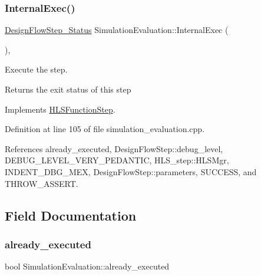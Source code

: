 \mbox{\label{classSimulationEvaluation_a08fa888750e787c0e4cdf88efcd50a8f}} 
\subsubsection{\texorpdfstring{Internal\+Exec()}{InternalExec()}}
{\footnotesize\ttfamily \hyperlink{design__flow__step_8hpp_afb1f0d73069c26076b8d31dbc8ebecdf}{Design\+Flow\+Step\+\_\+\+Status} Simulation\+Evaluation\+::\+Internal\+Exec (\begin{DoxyParamCaption}{ }\end{DoxyParamCaption})\hspace{0.3cm}{\ttfamily [override]}, {\ttfamily [virtual]}}



Execute the step. 

\begin{DoxyReturn}{Returns}
the exit status of this step 
\end{DoxyReturn}


Implements \hyperlink{classHLSFunctionStep_a8db4c00d080655984d98143206fc9fa8}{H\+L\+S\+Function\+Step}.



Definition at line 105 of file simulation\+\_\+evaluation.\+cpp.



References already\+\_\+executed, Design\+Flow\+Step\+::debug\+\_\+level, D\+E\+B\+U\+G\+\_\+\+L\+E\+V\+E\+L\+\_\+\+V\+E\+R\+Y\+\_\+\+P\+E\+D\+A\+N\+T\+IC, H\+L\+S\+\_\+step\+::\+H\+L\+S\+Mgr, I\+N\+D\+E\+N\+T\+\_\+\+D\+B\+G\+\_\+\+M\+EX, Design\+Flow\+Step\+::parameters, S\+U\+C\+C\+E\+SS, and T\+H\+R\+O\+W\+\_\+\+A\+S\+S\+E\+RT.



\subsection{Field Documentation}
\mbox{\label{classSimulationEvaluation_a4d3bf56963b28bb3aa34a286034a9791}} 
\subsubsection{\texorpdfstring{already\+\_\+executed}{already\_executed}}
{\footnotesize\ttfamily bool Simulation\+Evaluation\+::already\+\_\+executed\hspace{0.3cm}{\ttfamily [protected]}}



